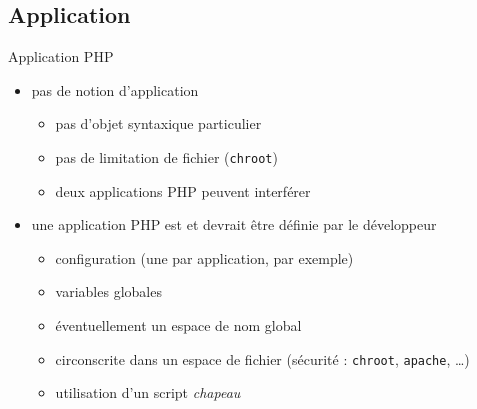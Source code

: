 \subsection{Application}

\begin{frame}{Application PHP}
	\begin{itemize}
		\item pas de notion d'application
		\begin{itemize}
			\item pas d'objet syntaxique particulier
			\item pas de limitation de fichier (\texttt{chroot})
			\item deux applications PHP peuvent interférer
		\end{itemize}
		\item une application PHP est et devrait être définie par le développeur
		\begin{itemize}
			\item configuration (une par application, par exemple)
			\item variables globales
			\item éventuellement un espace de nom global
			\item circonscrite dans un espace de fichier (sécurité : \texttt{chroot}, \texttt{apache}, \ldots)
			\item utilisation d'un script \emph{chapeau}
		\end{itemize}
	\end{itemize}
\end{frame}


